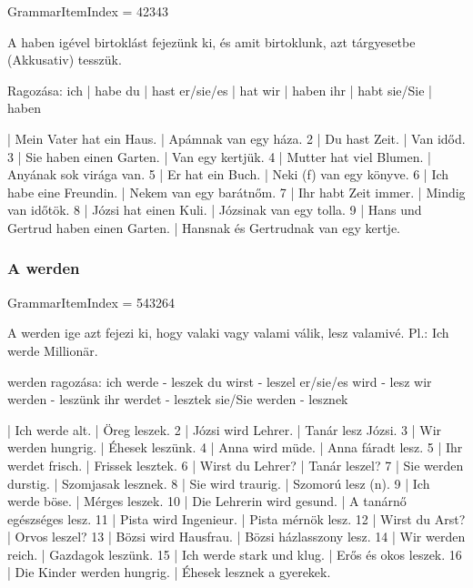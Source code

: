 \documentclass{article}
\newenvironment{desc}{\verbatim}{\endverbatim}
\newenvironment{exmp}{\verbatim}{\endverbatim}
\begin{document}
GrammarItemIndex = 42343

\begin{desc}
A haben igével birtoklást fejezünk ki, és amit birtoklunk, azt tárgyesetbe (Akkusativ) tesszük.

Ragozása:
ich       | habe
du        | hast
er/sie/es | hat
wir       | haben
ihr       | habt
sie/Sie   | haben
\end{desc}

\begin{exmp}
1 | Mein Vater hat ein Haus. | Apámnak van egy háza.
2 | Du hast Zeit. | Van időd.
3 | Sie haben einen Garten. | Van egy kertjük.
4 | Mutter hat viel Blumen. | Anyának sok virága van.
5 | Er hat ein Buch. | Neki (f) van egy könyve.
6 | Ich habe eine Freundin. | Nekem van egy barátnőm.
7 | Ihr habt Zeit immer. | Mindig van időtök.
8 | Józsi hat einen Kuli. | Józsinak van egy tolla.
9 | Hans und Gertrud haben einen Garten. | Hansnak és Gertrudnak van egy kertje.
\end{exmp}

\subsubsection{A werden}

GrammarItemIndex = 543264

\begin{desc}
A werden ige azt fejezi ki, hogy valaki vagy valami válik, lesz
valamivé.
Pl.: Ich werde Millionär.

werden ragozása:
ich werde - leszek 
du wirst - leszel
er/sie/es wird - lesz
wir werden - leszünk
ihr werdet - lesztek
sie/Sie werden - lesznek
\end{desc}

\begin{exmp}
1 | Ich werde alt. | Öreg leszek.
2 | Józsi wird Lehrer. | Tanár lesz Józsi.
3 | Wir werden hungrig. | Éhesek leszünk.
4 | Anna wird müde. | Anna fáradt lesz.
5 | Ihr werdet frisch. | Frissek lesztek.
6 | Wirst du Lehrer? | Tanár leszel?
7 | Sie werden durstig. | Szomjasak lesznek.
8 | Sie wird traurig. | Szomorú lesz (n).
9 | Ich werde böse. | Mérges leszek.
10 | Die Lehrerin wird gesund. | A tanárnő egészséges lesz.
11 | Pista wird Ingenieur. | Pista mérnök lesz.
12 | Wirst du Arst? | Orvos leszel?
13 | Bözsi wird Hausfrau. | Bözsi házlasszony lesz.
14 | Wir werden reich. | Gazdagok leszünk.
15 | Ich werde stark und klug. | Erős és okos leszek.
16 | Die Kinder werden hungrig. | Éhesek lesznek a gyerekek.
\end{exmp}
\end{document}
